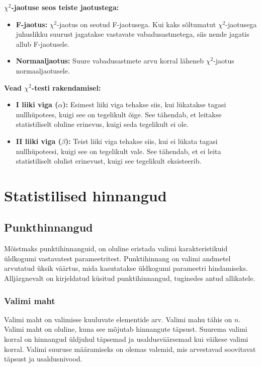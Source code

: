 \documentclass[
]{book}
\providecommand{\tightlist}{%
  \setlength{\itemsep}{0pt}\setlength{\parskip}{0pt}}
\begin{document}
\textbf{\(\chi^2\)-jaotuse seos teiste jaotustega:}

\begin{itemize}
\tightlist
\item
  \textbf{F-jaotus:} \(\chi^2\)-jaotus on seotud F-jaotusega. Kui kaks sõltumatut \(\chi^2\)-jaotusega juhuslikku suurust jagatakse vastavate vabadusastmetega, siis nende jagatis allub F-jaotusele.
\item
  \textbf{Normaaljaotus:} Suure vabadusastmete arvu korral läheneb \(\chi^2\)-jaotus normaaljaotusele.
\end{itemize}

\textbf{Vead \(\chi^2\)-testi rakendamisel:}

\begin{itemize}
\tightlist
\item
  \textbf{I liiki viga (\(\alpha\)):} Esimest liiki viga tehakse siis, kui lükatakse tagasi nullhüpotees, kuigi see on tegelikult õige. See tähendab, et leitakse statistiliselt oluline erinevus, kuigi seda tegelikult ei ole.
\item
  \textbf{II liiki viga (\(\beta\)):} Teist liiki viga tehakse siis, kui ei lükata tagasi nullhüpoteesi, kuigi see on tegelikult vale. See tähendab, et ei leita statistiliselt olulist erinevust, kuigi see tegelikult eksisteerib.
\end{itemize}

\chapter{Statistilised hinnangud}\label{statistilised-hinnangud}

\section{Punkthinnangud}\label{punkthinnangud}

Mõistmaks punktihinnanguid, on oluline eristada valimi karakteristikuid üldkogumi vastavatest parameetritest. Punktihinnang on valimi andmetel arvutatud üksik väärtus, mida kasutatakse üldkogumi parameetri hindamiseks. Alljärgnevalt on kirjeldatud küsitud punktihinnangud, tuginedes antud allikatele.

\subsection{Valimi maht}\label{valimi-maht}

Valimi maht on valimisse kuuluvate elementide arv. Valimi mahu tähis on \(n\). Valimi maht on oluline, kuna see mõjutab hinnangute täpsust. Suurema valimi korral on hinnangud üldjuhul täpsemad ja usaldusväärsemad kui väikese valimi korral. Valimi suuruse määramiseks on olemas valemid, mis arvestavad soovitavat täpsust ja usaldusnivood.
\end{document}
